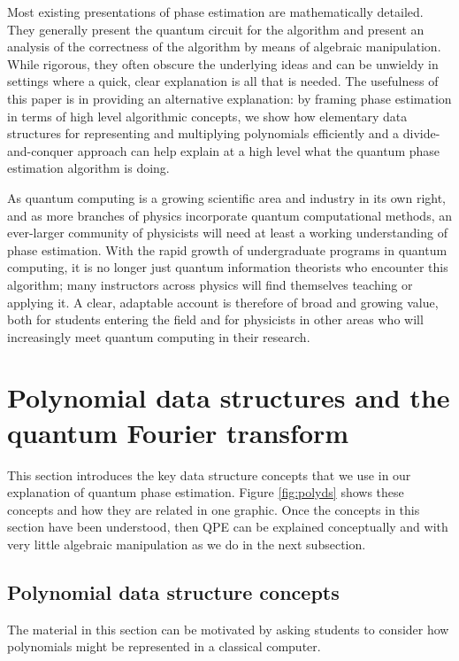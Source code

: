 \documentclass[12pt, a4paper]{article}
\begin{document}
Most existing presentations of phase estimation are mathematically detailed. They generally present the quantum circuit for the algorithm and present an analysis of the correctness of the algorithm by means of algebraic manipulation. While rigorous, they often obscure the underlying ideas and can be unwieldy in settings where a quick, clear explanation is all that is needed. The usefulness of this paper is in providing an alternative explanation: by framing phase estimation in terms of high level algorithmic concepts, we show how elementary data structures for representing and multiplying polynomials efficiently and a divide-and-conquer approach can help explain at a high level what the quantum phase estimation algorithm is doing. 

As quantum computing is a growing scientific area and industry in its own right, and as more branches of physics incorporate quantum computational methods, an ever-larger community of physicists will need at least a working understanding of phase estimation. With the rapid growth of undergraduate programs in quantum computing, it is no longer just quantum information theorists who encounter this algorithm; many instructors across physics will find themselves teaching or applying it. A clear, adaptable account is therefore of broad and growing value, both for students entering the field and for physicists in other areas who will increasingly meet quantum computing in their research.
	
\section{Polynomial data structures and the quantum Fourier transform}


This section introduces the key data structure concepts that we use in our explanation of quantum phase estimation. Figure \ref{fig:polyds} shows these concepts and how they are related in one graphic. Once the concepts in this section have been understood, then QPE can be explained conceptually and with very little algebraic manipulation as we do in the next subsection.
	

	\subsection{Polynomial data structure concepts}	
	
	The material in this section can be motivated by asking students to consider how polynomials might be represented in a classical computer. 
\end{document}
